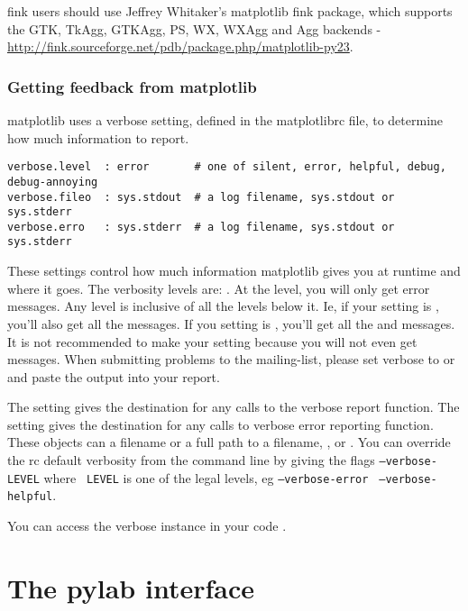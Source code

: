 \documentclass[twoside]{book}
\begin{document}
fink users should use Jeffrey Whitaker's matplotlib fink package,
which supports the GTK, TkAgg, GTKAgg, PS, WX, WXAgg and Agg backends
- \url{http://fink.sourceforge.net/pdb/package.php/matplotlib-py23}.

\subsection{Getting feedback from matplotlib}

matplotlib uses a verbose setting, defined in the matplotlibrc file,
to determine how much information to report. 

\begin{verbatim}
verbose.level  : error       # one of silent, error, helpful, debug, debug-annoying
verbose.fileo  : sys.stdout  # a log filename, sys.stdout or sys.stderr
verbose.erro   : sys.stderr  # a log filename, sys.stdout or sys.stderr

\end{verbatim}


\noindent These settings control how much information matplotlib gives you at
runtime and where it goes.  The verbosity levels are: .  At the  level,
you will only get error messages.  Any level is inclusive of all the
levels below it.  Ie, if your setting is , you'll also get
all the  messages.  If you setting is , you'll get
all the  and  messages.  It is not recommended
to make your setting  because you will not even get
 messages.  When submitting problems to the mailing-list,
please set verbose to  or  and paste the output
into your report.

The  setting gives the destination for any calls to
the verbose report function.  The  setting gives the
destination for any calls to verbose error reporting function.  These
objects can a filename or a full path to a filename, ,
or .  You can override the rc default verbosity from
the command line by giving the flags {\tt--verbose-LEVEL} where {\tt
  LEVEL} is one of the legal levels, eg {\tt --verbose-error} {\tt
  --verbose-helpful}.

You can access the verbose instance in your code 
.


\chapter{The pylab interface}
\label{cha:matlab_interface}
\end{document}
